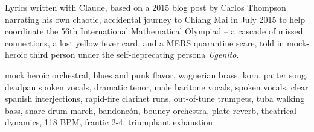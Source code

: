 

\begin{notes}
Lyrics written with Claude, based on a 2015 blog post by Carlos Thompson narrating his own chaotic, accidental journey to Chiang Mai in July 2015 to help coordinate the 56th International Mathematical Olympiad -- a cascade of missed connections, a lost yellow fever card, and a MERS quarantine scare, told in mock-heroic third person under the self-deprecating persona \emph{Ugenito}.
\end{notes}
\begin{style}
mock heroic orchestral, blues and punk flavor, wagnerian brass, kora, patter song, deadpan spoken vocals, dramatic tenor, male baritone vocals, spoken vocals, clear spanish interjections, rapid-fire clarinet runs, out-of-tune trumpets, tuba walking bass, snare drum march, bandoneón, bouncy orchestra, plate reverb, theatrical dynamics, 118 BPM, frantic 2-4, triumphant exhaustion
\end{style}
